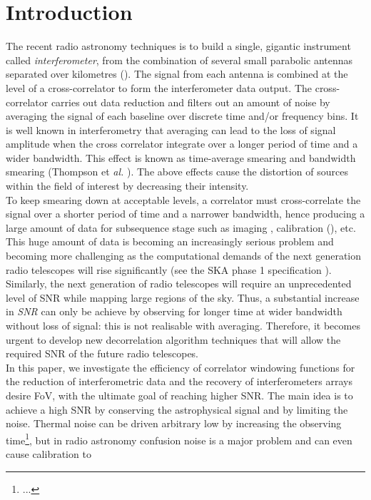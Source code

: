 \documentclass[useAMS,usenatbib]{mn2e}
\begin{document}
\section[]{Introduction}
The recent radio astronomy techniques is to build a single, gigantic instrument called \textit{interferometer}, from the combination of 
several small parabolic antennas separated over kilometres (\cite{2}). The signal from each antenna is combined at the level of a 
cross-correlator to form the interferometer  data output. The cross-correlator carries out  data reduction and filters out an amount of 
noise by averaging the signal of each baseline over discrete time and/or frequency bins.
It is well known in interferometry that averaging 
can lead to the loss of signal amplitude when the cross correlator integrate over a longer period of time and a wider bandwidth. This 
effect is known as time-average smearing and bandwidth smearing (Thompson et \textit{al.} \cite{2}). The above effects cause the distortion 
of sources within the 
field of interest by decreasing their intensity.\\
To keep smearing down at acceptable levels, a correlator must cross-correlate the signal over a shorter period of time and a narrower 
bandwidth, hence producing a large amount of data for subsequence stage such as 
imaging \citep{Marti2008,Linfield1986}, calibration (\cite{2}), etc. This huge amount of data is becoming an increasingly serious 
problem 
and becoming 
more challenging as the computational demands of the next generation radio telescopes will rise significantly (see the SKA phase 1 
specification \cite{2}). 
Similarly, the next generation of radio telescopes will require an unprecedented level of SNR while mapping large regions of the sky. Thus, 
a substantial 
increase in \textit{SNR} can only be achieve by observing for longer time at wider bandwidth without loss of signal: this is not 
realisable with averaging.
Therefore, it becomes urgent to develop new decorrelation algorithm techniques that will allow the required SNR of the future radio 
telescopes.\\
In this paper, we investigate the efficiency of correlator windowing functions for the reduction of 
interferometric data and the recovery of interferometers arrays desire FoV, with the ultimate goal of reaching higher SNR. The main idea is 
to achieve a high SNR by conserving the astrophysical signal and by limiting the noise. Thermal noise can be driven arbitrary low by 
increasing the observing time\footnote{...}, but in radio astronomy confusion noise is a major problem and can even cause calibration to 
\end{document}

